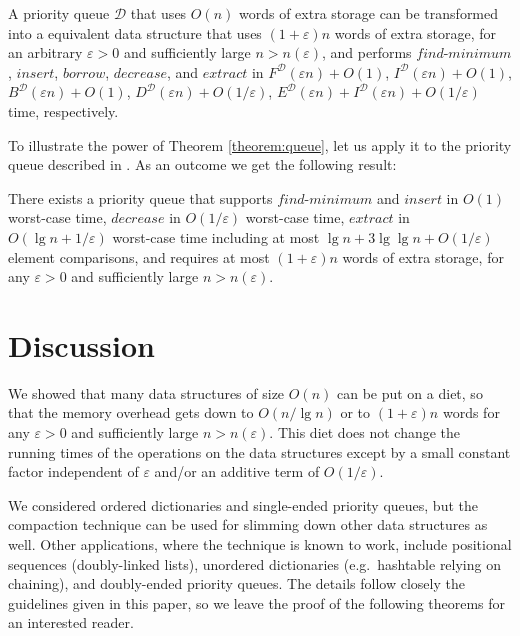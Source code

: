 \documentclass{DIKU-article}
\newcommand{\Findmin}{\mbox{$\mathit{find}$\textnormal{-}}\allowbreak{}\mbox{$\mathit{minimum}$}}
\newcommand{\Insert}{\mbox{$\mathit{insert}$}}
\newcommand{\Extract}{\mbox{$\mathit{extract}$}}
\newcommand{\Decrease}{\mbox{$\mathit{decrease}$}}
\newcommand{\Borrow}{\mbox{$\mathit{borrow}$}}
\newcommand{\seclabel}[1]{\label{sec:#1}}
\begin{document}
\begin{theorem}
\label{theorem:queue}
A priority queue $\mathcal{D}$ that uses $O(n)$ words of extra storage
can be transformed into a equivalent data structure that
uses
$(1+\varepsilon)n$ words of extra storage, for an arbitrary
$\varepsilon > 0$ and sufficiently large $n > n(\varepsilon)$, and performs 
\Findmin{}, \Insert{},
\Borrow{}, \Decrease{}, and \Extract{} in
$F^{\mathcal{D}}(\varepsilon n) + O(1)$,
$I^{\mathcal{D}}(\varepsilon n) + O(1)$,
$B^{\mathcal{D}}(\varepsilon n) + O(1)$,
$D^{\mathcal{D}}(\varepsilon n) + O(1/\varepsilon)$,
$E^{\mathcal{D}}(\varepsilon n) + I^{\mathcal{D}}(\varepsilon n) + O(1/\varepsilon)$ time, respectively.
\end{theorem}

To illustrate the power of Theorem \ref{theorem:queue}, let us apply
it to the priority queue described in \cite{EJK06}. As an outcome we
get the following result:

\begin{corollary}
\label{corollary:queue}
There exists a priority queue that supports \Findmin{} and \Insert{}
in $O(1)$ worst-case time, \Decrease{} in $O(1/\varepsilon)$
worst-case time, \Extract{} in $O(\lg n + 1/\varepsilon)$ worst-case
time including at most $\lg n + 3\lg\lg n + O(1/\varepsilon)$ element
comparisons, and requires at most $(1 + \varepsilon)n$ words of extra
storage, for any $\varepsilon > 0$ and sufficiently large $n > n(\varepsilon)$.
\end{corollary}

\section{Discussion}\seclabel{discussion}

We showed that many data structures of size $O(n)$ can be put on a
diet, so that the memory overhead gets down to $O(n/\lg n)$ or to $(1
+ \varepsilon)n$ words for any $\varepsilon >0$ and sufficiently large
$n > n(\varepsilon)$. This diet does not change the running times of
the operations on the data structures except by a small constant
factor independent of $\varepsilon$ and/or an additive term of
$O(1/\varepsilon)$.

We considered ordered dictionaries and single-ended priority queues,
but the compaction technique can be used for slimming down other data
structures as well. Other applications, where the technique is known
to work, include positional sequences (doubly-linked lists), unordered
dictionaries (e.g.~hashtable relying on chaining), and doubly-ended
priority queues.  The details follow closely the guidelines given in
this paper, so we leave the proof of the following theorems for an
interested reader.
\end{document}
